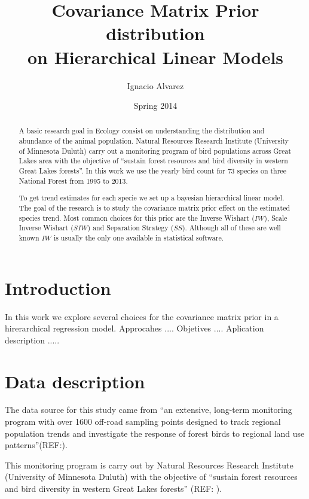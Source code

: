 \documentclass{article}
\title{ Covariance Matrix Prior distribution \\ on Hierarchical Linear Models }
\author{Ignacio Alvarez}
\date{ Spring 2014 }
\begin{document}
\maketitle 
\thispagestyle{empty}

\begin{abstract}
A basic research goal in Ecology consist on understanding the distribution and abundance of the animal population. Natural Resources Research Institute (University of Minnesota Duluth) carry out a monitoring program of bird populations across Great Lakes area with the objective of ``sustain forest resources and bird diversity in western Great Lakes forests''. In this work we use the yearly bird count for 73 species on three National Forest from 1995 to 2013.

To get trend estimates for each specie we set up a bayesian hierarchical linear model. The goal of the research is to study the covariance matrix prior effect on the estimated species trend. Most common choices for this prior are the Inverse Wishart ($IW$), Scale Inverse Wishart ($SIW$) and Separation Strategy ($SS$). Although all of these are well known $IW$ is usually the only one available in statistical software.
\end{abstract}


\newpage 

\tableofcontents
\thispagestyle{empty}

\newpage 

\section{Introduction} 

In this work we explore several choices for the covariance matrix prior in a hirerarchical regression model. 
Approcahes .... 
Objetives ....
Aplication description .....

\section{Data description}
The data source for this study came from ``an extensive, long-term monitoring program with over 1600 off-road sampling points designed to track regional population trends and investigate the response of forest birds to regional land use patterns''(REF:). 

This monitoring program is carry out by Natural Resources Research Institute (University of Minnesota Duluth) with the objective of ``sustain forest resources and bird diversity in western Great Lakes forests'' (REF: ). 
\end{document}
